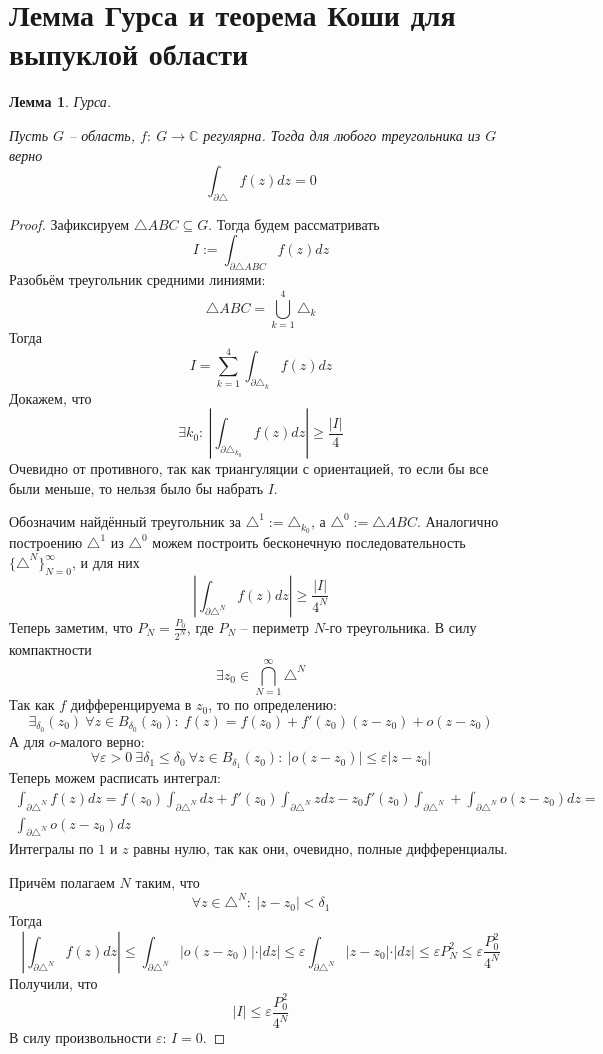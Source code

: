 \documentclass[a4paper,12pt]{article}
\renewcommand{\leq}{\ensuremath{\leqslant}}
\renewcommand{\geq}{\ensuremath{\geqslant}}
\theoremstyle{plain}
\newtheorem{lemma}{Лемма}[section]
\theoremstyle{definition}
\theoremstyle{remark}
\begin{document}
\section{Лемма Гурса и теорема Коши для выпуклой области}
\begin{lemma}
	Гурса.

	Пусть $G$ -- область, $f :\: G \to \mathbb{C}$ регулярна. Тогда для любого треугольника из $G$ верно
	\[
		\int_{\partial\triangle} f(z)dz = 0
	\]
\end{lemma}

\begin{proof}
	Зафиксируем $\triangle ABC \subseteq G$. Тогда будем рассматривать
	\[
		I := \int_{\partial\triangle ABC}f(z)dz
	\]
	Разобьём треугольник средними линиями:
	\[
		\triangle ABC = \bigcup_{k = 1}^4 \triangle_k
	\]
	Тогда
	\[
		I = \sum_{k = 1}^4 \int_{\partial \triangle_k}f(z)dz
	\]
	Докажем, что
	\[
		\exists k_0 :\: \left\vert \int_{\partial \triangle_{k_0}}f(z)dz\right\vert \geq \frac{\vert I\vert}{4}
	\]
	Очевидно от противного, так как триангуляции с ориентацией, то если бы все были меньше, то нельзя было бы набрать $I$.

	Обозначим найдённый треугольник за $\triangle^1 := \triangle_{k_0}$, а $\triangle^0 := \triangle ABC$. Аналогично построению $\triangle^1$ из $\triangle^0$ можем построить бесконечную последовательность $\{\triangle^N\}_{N = 0}^\infty$, и для них
	\[
		\left\vert \int_{\partial \triangle^N}f(z)dz\right\vert \geq \frac{\vert I\vert}{4^N}
	\]
	Теперь заметим, что $P_N = \frac{P_0}{2^N}$, где $P_N$ -- периметр $N$-го треугольника. В силу компактности
	\[
		\exists z_0 \in \bigcap_{N = 1}^\infty \triangle^N
	\]
	Так как $f$ дифференцируема в $z_0$, то по определению:
	\[
		\exists_{\delta_0}(z_0) \: \forall z \in B_{\delta_0}(z_0) :\: f(z) = f(z_0) + f'(z_0)(z - z_0) + o(z - z_0)
	\]
	А для $o$-малого верно:
	\[
		\forall \varepsilon > 0 \: \exists \delta_1 \leq \delta_0 \: \forall z \in B_{\delta_1}(z_0) :\: \vert o(z - z_0)\vert \leq \varepsilon\vert z - z_0\vert
	\]
	Теперь можем расписать интеграл:
  \begin{align*}
    \int_{\partial\triangle^N}f(z)dz = f(z_0)\int_{\partial\triangle^N}dz + f'(z_0)\int_{\partial\triangle^N}zdz - z_0f'(z_0)\int_{\partial\triangle^N} + \int_{\partial\triangle^N}o(z - z_0)dz =\\
    \int_{\partial\triangle^N}o(z - z_0)dz
  \end{align*}
  Интегралы по $1$ и $z$ равны нулю, так как они, очевидно, полные дифференциалы.

  Причём полагаем $N$ таким, что
  \[
    \forall z \in \triangle^N :\: \vert z - z_0\vert < \delta_1
  \]
  Тогда 
  \[
    \left\vert\int_{\partial\triangle^N} f(z)dz\right\vert \leq \int_{\partial\triangle^N} \vert o(z - z_0)\vert\cdot\vert dz\vert \leq \varepsilon\int_{\partial\triangle^N} \vert z - z_0\vert\cdot\vert dz\vert \leq \varepsilon P_N^2 \leq \varepsilon\frac{P_0^2}{4^N}
  \]
  Получили, что
  \[
    \vert I\vert \leq \varepsilon\frac{P_0^2}{4^N}
  \]
  В силу произвольности $\varepsilon$: $I = 0$.
\end{proof}
\end{document}
